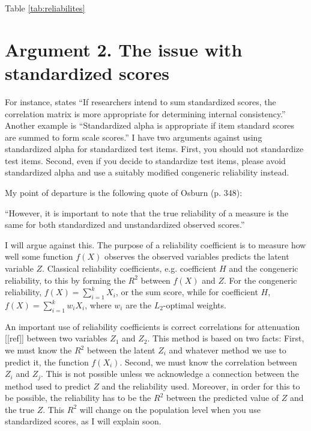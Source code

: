 \documentclass{article}
\theoremstyle{plain}
\theoremstyle{plain}
\theoremstyle{definition}
\theoremstyle{remark}
\theoremstyle{definition}
\theoremstyle{plain}
\theoremstyle{plain}
\theoremstyle{definition}
\begin{document}
Table \ref{tab:reliabilites}




\section{Argument 2. The issue with standardized scores}
\label{sec:argument 2}
For instance, \citet[][p.451]{Falk2011-ae} states \enquote{If researchers intend to sum
standardized scores, the correlation matrix is more appropriate for determining internal consistency.} Another example is \citet[][p.99]{Cortina1993-aq} \enquote{Standardized alpha is appropriate if item standard scores are summed to form scale scores.}
I have two arguments against using standardized alpha for standardized
test items. First, you should not standardize test items. Second,
even if you decide to standardize test items, please avoid standardized
alpha and use a suitably modified congeneric reliability instead.

My point of departure is the following quote of Osburn (p. 348):

\enquote{However, it is important to note that the true reliability of a measure is the same for both standardized and unstandardized observed scores.}

I will argue against this. The purpose of a reliability coefficient is to measure how well some function $f(X)$ observes the observed variables predicts the latent variable $Z$. Classical reliability coefficients, e.g. coefficient $H$ and the congeneric reliability, to this by forming the $R^2$ between $f(X)$ and $Z$. For the congeneric reliability, $f(X) = \sum_{i=1}^k X_i$, or the sum score, while for coefficient $H$, $f(X) = \sum_{i=1}^k w_iX_i$, where $w_i$ are the $L_2$-optimal weights.

An important use of reliability coefficients is correct correlations for attenuation [[ref]] between two variables $Z_1$ and $Z_2$. This method is based on two facts: First, we must know the $R^2$ between the latent $Z_i$ and whatever method we use to predict it, the function $f(X_i)$. Second, we must know the correlation between $Z_i$ and $Z_j$. This is not possible unless we acknowledge a connection between the method used to predict $Z$ and the reliability used. Moreover, in order for this to be possible, the reliability has to be the $R^{2}$ between the predicted value of $Z$ and the true $Z$. This $R^{2}$
will change on the population level when you use standardized scores,
as I will explain soon.
\end{document}

